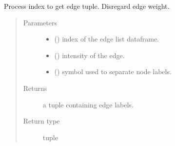 \documentclass[letterpaper,10pt,english]{sphinxmanual}
\begin{document}
\begin{fulllineitems}
\label{\detokenize{_modules/cosifer.collections:cosifer.collections.interaction_table.process_index}}
Process index to get edge tuple. Disregard edge weight.
\begin{quote}\begin{description}
\item[{Parameters}] \leavevmode\begin{itemize}
\item {} 
 () \textendash{} index of the edge list dataframe.

\item {} 
 () \textendash{} intensity of the edge.

\item {} 
 () \textendash{} symbol used to separate node labels.

\end{itemize}

\item[{Returns}] \leavevmode
a tuple containing edge labels.

\item[{Return type}] \leavevmode
tuple

\end{description}\end{quote}

\end{fulllineitems}

\end{document}
